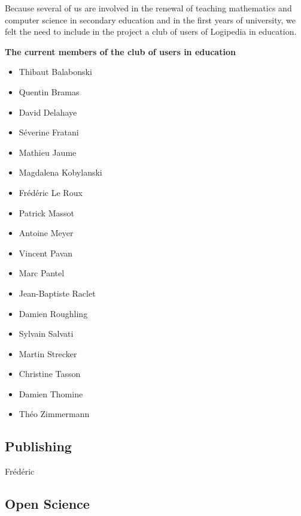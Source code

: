 Because several of us are involved in the renewal of teaching
mathematics and computer science in secondary education and in the
first years of university, we felt the need to include in the project
a club of users of Logipedia in education.

\begin{framed}
\begin{center}
{\bf \Large The current members of the club of users in education}
\end{center}


\begin{itemize}

\item Thibaut Balabonski	
\item Quentin Bramas
\item David Delahaye
\item Séverine Fratani	
\item Mathieu Jaume
\item Magdalena Kobylanski
\item Frédéric Le Roux
\item Patrick Massot
\item Antoine Meyer	
\item Vincent Pavan
\item Marc Pantel
\item Jean-Baptiste Raclet
\item Damien Roughling
\item Sylvain Salvati
\item Martin Strecker
\item Christine Tasson
\item Damien Thomine
\item Théo Zimmermann	
\end{itemize}


\end{framed}


\subsection{Publishing}

{\color{red} Frédéric}  

\subsection{Open Science}


